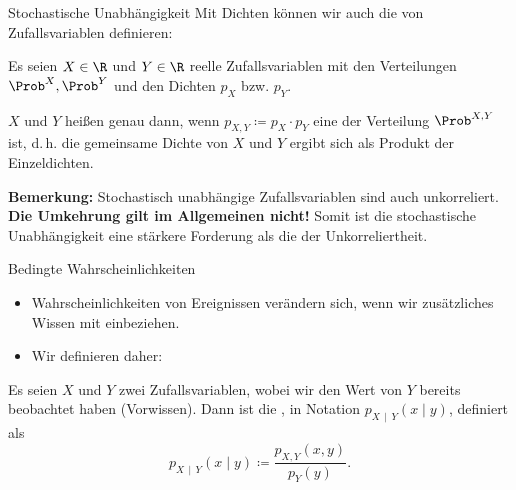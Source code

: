\begin{frame}{Stochastische Unabhängigkeit}{}
	Mit Dichten können wir auch die  von Zufallsvariablen definieren:
	
	\begin{mydef}
		Es seien $X \in \R$ und $Y \in \R$ reelle Zufallsvariablen mit den Verteilungen $\Prob^X, \Prob^Y$
		und den Dichten $p_X$ bzw. $p_Y$.

		$X$ und $Y$ heißen  genau dann, wenn $p_{X, Y} \coloneqq p_X \cdot p_Y$
		eine  der Verteilung $\Prob^{X, Y}$ ist, d.\,h. die gemeinsame Dichte von $X$ und $Y$
		ergibt sich als Produkt der Einzeldichten. 
	\end{mydef}

	\begin{boxGray}
		\textbf{Bemerkung:} Stochastisch unabhängige Zufallsvariablen sind auch unkorreliert.
		\textbf{Die Umkehrung gilt im Allgemeinen nicht!}
		Somit ist die stochastische Unabhängigkeit eine stärkere Forderung als die der Unkorreliertheit.
	\end{boxGray}
\end{frame}


\begin{frame}{Bedingte Wahrscheinlichkeiten}{}
	\begin{itemize}
		\item Wahrscheinlichkeiten von Ereignissen verändern sich, wenn wir zusätzliches Wissen mit einbeziehen.
		\item Wir definieren daher:
	\end{itemize}
	\begin{mydef}
		Es seien $X$ und $Y$ zwei Zufallsvariablen, wobei wir den Wert von $Y$ bereits beobachtet haben (Vorwissen).
		Dann ist die , in Notation $p_{X\,\mid\,Y}(x \mid y)$,
		definiert als
		\begin{equation*}
			p_{X\,\mid\,Y}(x \mid y) \coloneqq \frac{p_{X, Y}(x, y)}{p_Y(y)}.
		\end{equation*}
	\end{mydef}
\end{frame}


